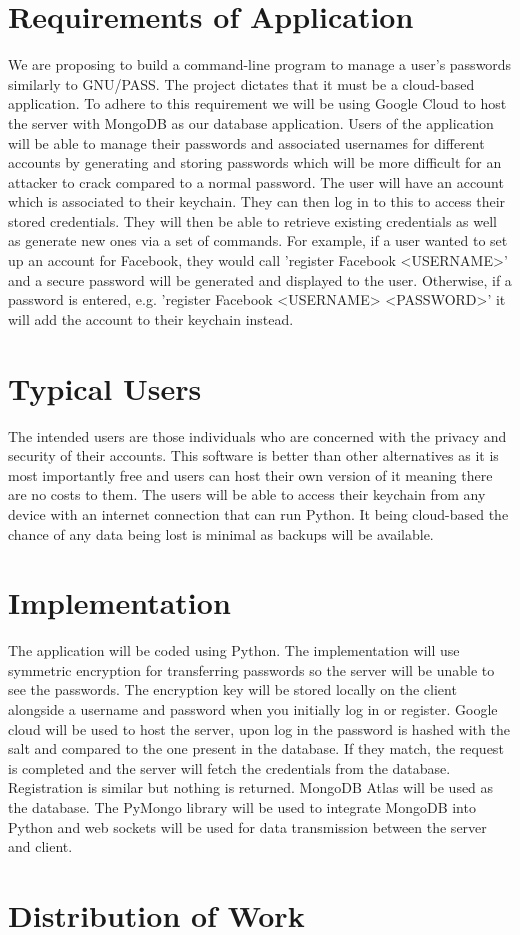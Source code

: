 \documentclass[11pt]{article}
\begin{document}
\section{Requirements of Application}
We are proposing to build a command-line program to manage a user's passwords similarly to GNU/PASS. The project dictates that it must be a cloud-based application. To adhere to this requirement we will be using Google Cloud to host the server with MongoDB as our database application. Users of the application will be able to manage their passwords and associated usernames for different accounts by generating and storing passwords which will be more difficult for an attacker to crack compared to a normal password. The user will have an account which is associated to their keychain. They can then log in to this to access their stored credentials. They will then be able to retrieve existing credentials as well as generate new ones via a set of commands. For example, if a user wanted to set up an account for Facebook, they would call 'register Facebook <USERNAME>' and a secure password will be generated and displayed to the user. Otherwise, if a password is entered, e.g. 'register Facebook <USERNAME> <PASSWORD>' it will add the account to their keychain instead.
\section{Typical Users}
The intended users are those individuals who are concerned with the privacy and security of their accounts. This software is better than other alternatives as it is most importantly free and users can host their own version of it meaning there are no costs to them. The users will be able to access their keychain from any device with an internet connection that can run Python. It being cloud-based the chance of any data being lost is minimal as backups will be available.
\section{Implementation}
The application will be coded using Python. The implementation will use symmetric encryption for transferring passwords so the server will be unable to see the passwords. The encryption key will be stored locally on the client alongside a username and password when you initially log in or register. Google cloud will be used to host the server, upon log in the password is hashed with the salt and compared to the one present in the database. If they match, the request is completed and the server will fetch the credentials from the database. Registration is similar but nothing is returned. MongoDB Atlas will be used as the database. The PyMongo library will be used to integrate MongoDB into Python and web sockets will be used for data transmission between the server and client.
\section{Distribution of Work}
\end{document}
